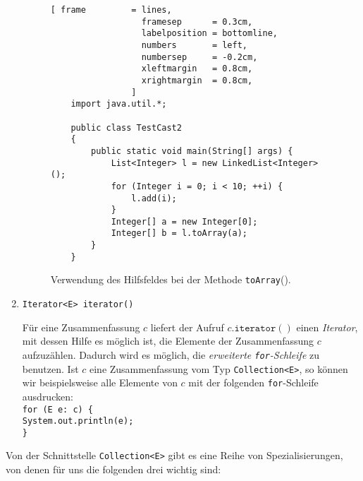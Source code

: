 \begin{enumerate}
\begin{figure}[!h]
\centering
\begin{Verbatim}[ frame         = lines, 
                  framesep      = 0.3cm, 
                  labelposition = bottomline,
                  numbers       = left,
                  numbersep     = -0.2cm,
                  xleftmargin   = 0.8cm,
                  xrightmargin  = 0.8cm,
                ]
    import java.util.*;
    
    public class TestCast2 
    {
        public static void main(String[] args) {
            List<Integer> l = new LinkedList<Integer>();
            for (Integer i = 0; i < 10; ++i) {
                l.add(i);
            }
            Integer[] a = new Integer[0];
            Integer[] b = l.toArray(a);
        }
    }
\end{Verbatim}
\vspace*{-0.3cm}
\caption{Verwendung des Hilfsfeldes bei der Methode \texttt{toArray}().}
\label{fig:TestCast2.java}
\end{figure}



\item \texttt{Iterator<E> iterator()}

      F\"ur eine Zusammenfassung $c$ liefert der Aufruf $c.\mathtt{iterator}()$ einen
      \emph{Iterator}, mit dessen Hilfe es m\"oglich ist, die Elemente der Zusammenfassung
      $c$ aufzuz\"ahlen.  Dadurch wird es m\"oglich, die \emph{erweiterte \texttt{for}-Schleife}
      zu benutzen.  Ist $c$ eine Zusammenfassung vom Typ \texttt{Collection<E>}, so k\"onnen
      wir beispielsweise alle Elemente von $c$ mit der folgenden \texttt{for}-Schleife ausdrucken: 
      \\[0.2cm]
      \hspace*{1.3cm} \texttt{for (E e: c) \{} \\
      \hspace*{1.8cm} \texttt{System.out.println(e);} \\
      \hspace*{1.3cm} \texttt{\}} 
\end{enumerate}
Von der Schnittstelle \texttt{Collection<E>} gibt es eine Reihe von Spezialisierungen, von
denen f\"ur uns die folgenden drei wichtig sind:
